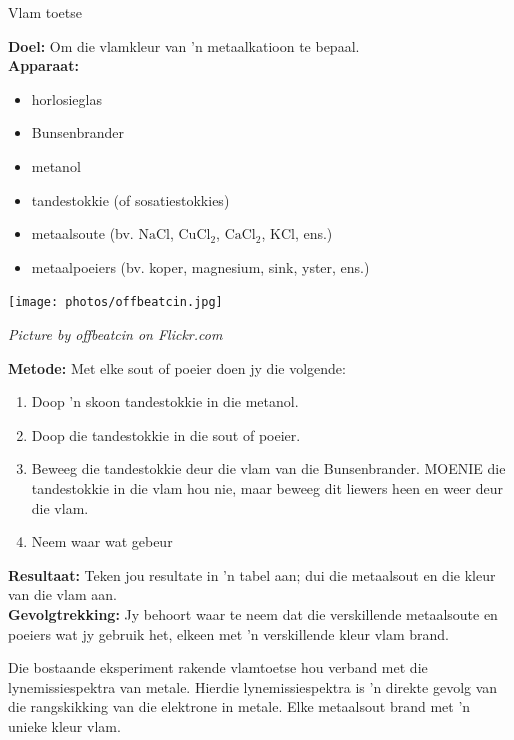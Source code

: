 \nopagebreak
\begin{i_experiment}{Vlam toetse}{
\nopagebreak
\textbf{Doel:}\newline
Om die vlamkleur van 'n metaalkatioon te bepaal.\\
\textbf{Apparaat:}\newline
\begin{minipage}{.5\textwidth}
\begin{itemize}[noitemsep]
\item horlosieglas
\item Bunsenbrander
\item metanol
\item tandestokkie (of sosatiestokkies)
\item metaalsoute (bv. $\text{NaCl}$, ${\text{CuCl}}_{2}$, ${\text{CaCl}}_{2}$, $\text{KCl}$, ens.)
\item metaalpoeiers (bv. koper, magnesium, sink, yster, ens.)
\end{itemize}
\end{minipage}
\begin{minipage}{.5\textwidth}
\begin{center}
 \texttt{[image: photos/offbeatcin.jpg]}\par
\textit{Picture by offbeatcin on Flickr.com}
\end{center}
\end{minipage}
\textbf{Metode:}\newline
Met elke sout of poeier doen jy die volgende: 
\begin{enumerate}[noitemsep, label=\textbf{\arabic*}. ] 
\item Doop 'n skoon tandestokkie in die metanol.
\item Doop die tandestokkie in die sout of poeier.
\item Beweeg die tandestokkie deur die vlam van die Bunsenbrander. MOENIE die tandestokkie in die vlam hou nie,
maar beweeg dit liewers heen en weer deur die vlam.
\item Neem waar wat gebeur
\end{enumerate}
\textbf{Resultaat:}\newline
Teken jou resultate in 'n tabel aan; dui die metaalsout en die kleur van die vlam aan.
\\ 
\textbf{Gevolgtrekking:}\newline
Jy behoort waar te neem dat die verskillende metaalsoute en poeiers wat jy gebruik het, elkeen met 'n verskillende kleur vlam brand.}
\end{i_experiment}
Die bostaande eksperiment rakende vlamtoetse hou verband met die lynemissiespektra van metale. Hierdie lynemissiespektra is 'n direkte gevolg van die rangskikking van die elektrone in metale. Elke metaalsout brand met 'n unieke kleur vlam. \par 

